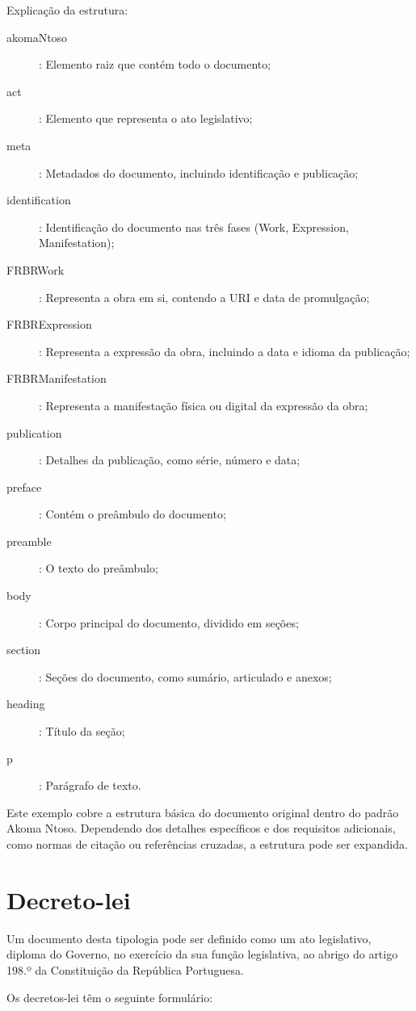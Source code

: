 Explicação da estrutura:
\begin{description}
\item[akomaNtoso]: Elemento raiz que contém todo o documento;
\item[act]: Elemento que representa o ato legislativo;
\item[meta]: Metadados do documento, incluindo identificação e publicação;
\item[identification]: Identificação do documento nas três fases (Work, Expression, Manifestation);
\item[FRBRWork]: Representa a obra em si, contendo a URI e data de promulgação;
\item[FRBRExpression]: Representa a expressão da obra, incluindo a data e idioma da publicação;
\item[FRBRManifestation]: Representa a manifestação física ou digital da expressão da obra;
\item[publication]: Detalhes da publicação, como série, número e data;
\item[preface]: Contém o preâmbulo do documento;
\item[preamble]: O texto do preâmbulo;
\item[body]: Corpo principal do documento, dividido em seções;
\item[section]: Seções do documento, como sumário, articulado e anexos;
\item[heading]: Título da seção;
\item[p]: Parágrafo de texto.
\end{description}

Este exemplo cobre a estrutura básica do documento original dentro do padrão Akoma Ntoso. 
Dependendo dos detalhes específicos e dos requisitos adicionais, como normas de citação ou referências cruzadas, 
a estrutura pode ser expandida.


\section{Decreto-lei}

Um documento desta tipologia pode ser definido como um ato legislativo, diploma do Governo, no exercício 
da sua função legislativa, ao abrigo do artigo 198.º da Constituição da República Portuguesa.

Os decretos-lei têm o seguinte formulário:

